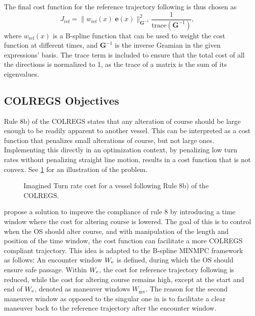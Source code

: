 The final cost function for the reference trajectory following is thus chosen as
\begin{equation}\label{eq:cost-reference-following}
    J_\text{ref} = \|w_\text{ref}(x)\;\mathbf e(x)\|_{\mathbf G^{-1}}^2 \frac{1}{\text{trace}(\mathbf G^{-1})},
\end{equation}
where $w_\text{ref}(x)$ is a B-spline function that can be used to weight the cost function at different times, and $\mathbf G^{-1}$ is the inverse Gramian in the given expressions' basis. The trace term is included to ensure that the total cost of all the directions is normalized to 1, as the trace of a matrix is the sum of its eigenvalues.


%     


\FloatBarrier
\subsection{COLREGS Objectives}\label{sec:colregs-objectives}
Rule 8b) of the COLREGS states that any alteration of course should be large enough to be readily apparent to another vessel. 
This can be interpreted as a cost function that penalizes small alterations of course, but not large ones. 
Implementing this directly in an optimization context, by penalizing low turn rates without penalizing straight line motion, results in a cost function that is not convex. 
See \cref{fig:turn-rate-cost} for an illustration of the problem.

\begin{figure}
    \centering
    
    \caption{Imagined Turn rate cost for a vessel following Rule 8b) of the COLREGS.}
    \label{fig:turn-rate-cost}
\end{figure}

\cite{Thyri2022-MPC} propose a solution to improve the compliance of rule 8 by introducing a time window where the cost for altering course is lowered. The goal of this is to control when the OS should alter course, and with manipulation of the length and position of the time window, the cost function can facilitate a more COLREGS compliant trajectory. This idea is adapted to the B-spline MINMPC framework as follows:
An encounter window $W_\text e$ is defined, during which the OS should ensure safe passage. Within $W_\text e$, the cost for reference trajectory following is reduced, while the cost for altering course remains high, except at the start and end of $W_\text e$, denoted as maneuver windows $W_\text{mv}$. 
The reason for the second maneuver window as opposed to the singular one in \cite{Thyri2022-MPC} is to facilitate a clear maneuver back to the reference trajectory after the encounter window.

